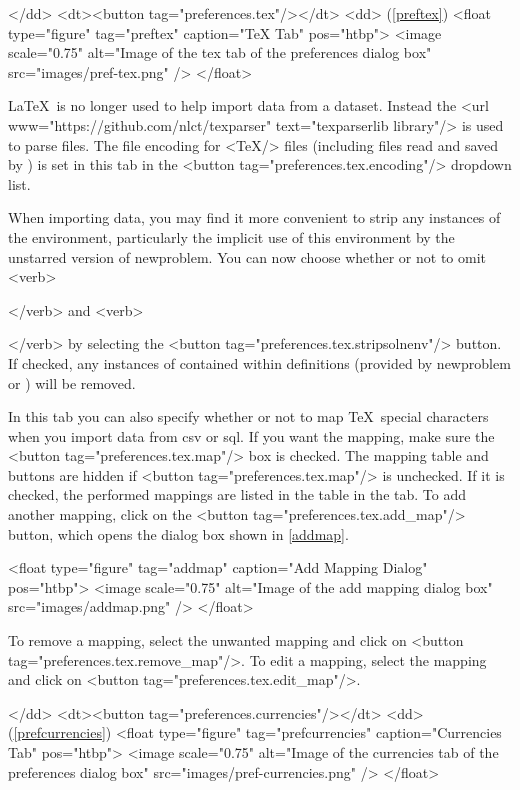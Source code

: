     </dd>
    <dt><button tag="preferences.tex"/></dt>
    <dd>
     (\autoref{preftex})
     <float type="figure" tag="preftex" caption="TeX Tab" pos="htbp">
      <image scale="0.75" alt="Image of the tex tab of the preferences dialog box" src="images/pref-tex.png" />
     </float>

    \LaTeX\ is no longer used to help  import data from 
    a  dataset. Instead the <url 
     www="https://github.com/nlct/texparser"
     text="texparserlib library"/> is used to parse  files. The file encoding for <TeX/>
    files (including  files read and saved by ) is set in this tab in the <button tag="preferences.tex.encoding"/> dropdown list.


    When importing  data, you may find it more convenient
    to strip any instances of the  environment, 
    particularly the implicit use of this environment by the
    unstarred version of \gls{newproblem}. You can now choose whether or 
    not to omit <verb>\begin{solution}</verb> and <verb>\end{solution}</verb>
    by selecting the <button tag="preferences.tex.stripsolnenv"/> button.
    If checked, any instances of  contained within 
    definitions (provided by \gls{newproblem} or ) 
    will be removed.

In this tab you can also specify whether or not to map \TeX\ special 
    characters when you import data from \gls{csv} or \gls{sql}.
    If you want the mapping, make sure the <button tag="preferences.tex.map"/>
    box is checked. The mapping table and buttons are hidden if 
    <button tag="preferences.tex.map"/> is unchecked. If it is checked, 
    the performed mappings are listed
    in the table in the tab. To add another mapping, click on the
    <button tag="preferences.tex.add_map"/> button, which opens the 
    dialog box shown in \autoref{addmap}. 

     <float type="figure" tag="addmap" caption="Add Mapping Dialog" pos="htbp">
      <image scale="0.75" alt="Image of the add mapping dialog box" src="images/addmap.png" />
     </float>

    To remove a mapping, select the unwanted mapping and click on 
    <button tag="preferences.tex.remove_map"/>. To edit a mapping,
    select the mapping and click on <button tag="preferences.tex.edit_map"/>.

    </dd>
    <dt><button tag="preferences.currencies"/></dt>
    <dd>
     (\autoref{prefcurrencies})
     <float type="figure" tag="prefcurrencies" caption="Currencies Tab" pos="htbp">
      <image scale="0.75" alt="Image of the currencies tab of the preferences dialog box" src="images/pref-currencies.png" />
     </float>

